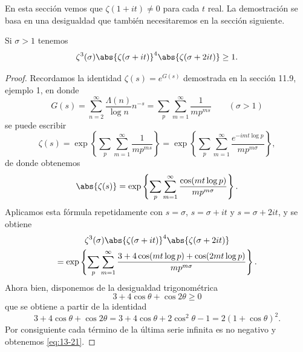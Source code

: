 \documentclass[12pt,a4paper]{book}
\begin{document}
    En esta sección vemos que $\zeta(1+it)\neq0$ para cada $t$ real. La demostración se basa
    en una desigualdad que también necesitaremos en la sección siguiente.

    \begin{teorema}\label{teo:13-5}
        Si $\sigma>1$ tenemos
        \begin{equation}\label{eq:13-21}
            \zeta^{3}(\sigma)\abs{\zeta(\sigma+it)}^{4}\abs{\zeta(\sigma+2it)}\geq1.
        \end{equation}
    \end{teorema}

    \begin{proof}
        Recordamos la identidad $\zeta(s)=e^{G(s)}$ demostrada en la sección 11.9, ejemplo 1,
        en donde
        \begin{equation*}
            G(s)=\sum_{n=2}^{\infty}\frac{\Lambda(n)}{\log n}n^{-s}=\sum_{p}\sum_{m=1}^{\infty}\frac{1}{mp^{ms}}\qquad(\sigma>1)
        \end{equation*}
        se puede escribir
        \begin{equation*}
            \zeta(s)=\exp\left\{\sum_{p}\sum_{m=1}^{\infty}\frac{1}{mp^{ms}}\right\}=\exp\left\{\sum_{p}\sum_{m=1}^{\infty}\frac{e^{-imt\log p}}{mp^{m\sigma}}\right\},
        \end{equation*}
        de donde obtenemos
        \begin{equation*}
            \abs{\zeta(s)}=\exp\left\{\sum_{p}\sum_{m=1}^{\infty}\frac{\cos(mt\log p)}{mp^{m\sigma}}\right\}.
        \end{equation*}
        Aplicamos esta fórmula repetidamente con $s=\sigma$, $s=\sigma+it$ y $s=\sigma+2it$, y se
        obtiene
        \begin{multline*}
            \zeta^{3}(\sigma)\abs{\zeta(\sigma+it)}^{4}\abs{\zeta(\sigma+2it)}\\
            =\exp\left\{\sum_{p}\sum_{m=1}^{\infty}\frac{3+4\cos(mt\log p)+\cos(2mt\log p)}{mp^{m\sigma}}\right\}.
        \end{multline*}
        Ahora bien, disponemos de la desigualdad trigonométrica
        \begin{equation*}
            3+4\cos\theta+\cos2\theta\geq0
        \end{equation*}
        que se obtiene a partir de la identidad
        \begin{equation*}
            3+4\cos\theta+\cos2\theta=3+4\cos\theta+2\cos^{2}\theta-1=2(1+\cos\theta)^{2}.
        \end{equation*}
        Por consiguiente cada término de la última serie infinita es no negativo y obtenemos
        \eqref{eq:13-21}.
    \end{proof}
\end{document}
